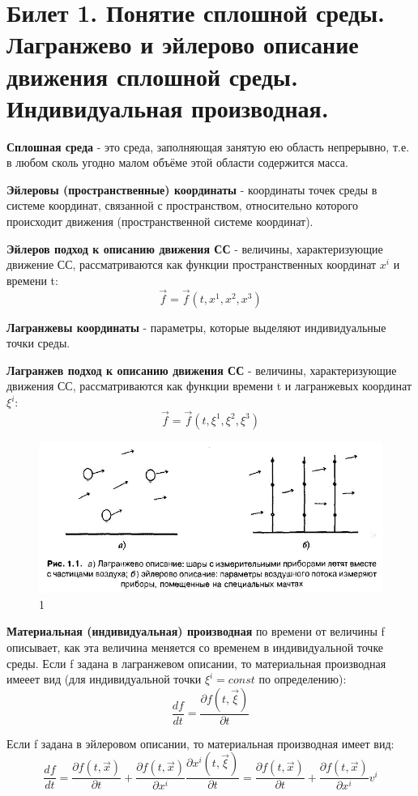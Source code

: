 \newpage
\section{Билет 1. Понятие сплошной среды. Лагранжево и эйлерово описание движения сплошной среды. Индивидуальная производная.}

\textbf{Сплошная среда} - это среда, заполняющая занятую ею область непрерывно, т.е. в любом сколь угодно малом объёме этой области содержится масса.

\textbf{Эйлеровы (пространственные) координаты} - координаты точек среды в системе координат, связанной с пространством, относительно которого происходит движения (пространственной системе координат).

\textbf{Эйлеров подход к описанию движения СС} - величины, характеризующие движение СС, рассматриваются как функции пространственных координат $x^i$ и времени t: $$\vec{f} = \vec{f}(t, x^1, x^2, x^3)$$

\textbf{Лагранжевы координаты} - параметры, которые выделяют индивидуальные точки среды.

\textbf{Лагранжев подход к описанию движения СС} - величины, характеризующие движения СС, рассматриваются как функции времени t и лагранжевых координат $\xi^i$: $$\vec{f} = \vec{f}(t, \xi^1, \xi^2, \xi^3)$$
\begin{figure}[h]
  \includegraphics[width=1\textwidth]{01/t1_pic1.JPG}
  \caption{\label{ris:image1_2}1}
\end{figure}

\textbf{Материальная (индивидуальная) производная} по времени от величины f описывает, как эта величина меняется со временем в индивидуальной точке среды. Если f задана в лагранжевом описании, то материальная производная имееет вид (для индивидуальной точки $\xi^i = const $ по определению): $$\frac{df}{dt} = \frac{\partial f(t,\vec{\xi})}{\partial t}$$

Если f задана в эйлеровом описании, то материальная производная имеет вид: $$\frac{df}{dt} = \frac{\partial f(t,\vec{x})}{\partial t} + \frac{\partial f(t, \vec{x})}{\partial x^i}\frac{\partial x^i(t,\vec{\xi})}{\partial t} = \frac{\partial f(t,\vec{x})}{\partial t} + \frac{\partial f(t, \vec{x})}{\partial x^i}v^i$$

